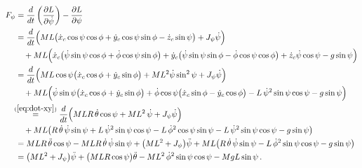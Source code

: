 \documentclass[a4paper]{article}
\newcommand{\pitch}{\psi}
\newcommand{\yaw}{\phi}
\newcommand{\roll}{\theta}
\begin{document}
\begin{equation} \begin{split}
    F_\pitch
    &= \frac{d}{dt} \left( \frac{\partial L}{\partial \dot\pitch} \right)
     - \frac{\partial L}{\partial \pitch}
    \\
    &= \frac{d}{dt} \Big( M L \big( \dot{x}_c \cos\pitch \cos\yaw
                                  + \dot{y}_c \cos\pitch \sin\yaw
                                  - \dot{z}_c \sin\pitch
                              \big)
                        + J_\pitch \dot\pitch
                    \Big)
    \\ &\quad + M L \Big( \dot{x}_c \big( \dot\pitch \sin\pitch \cos\yaw
                                        + \dot\yaw \cos\pitch \sin\yaw
                                    \big)
                        + \dot{y}_c \big( \dot\pitch \sin\pitch \sin\yaw
                                        - \dot\yaw \cos\pitch \cos\yaw
                                    \big)
                        + \dot{z}_c \dot\pitch \cos\pitch
                        - g \sin\pitch
                    \Big)
    \\
    &= \frac{d}{dt} \Big( M L \cos\pitch \big( \dot{x}_c \cos\yaw
                                             + \dot{y}_c \sin\yaw
                                         \big)
                        + M L^2 \dot\pitch \sin^2\pitch
                        + J_\pitch \dot\pitch
                    \Big)
    \\ &\quad + M L \Big( \dot\pitch \sin\pitch \big( \dot{x}_c \cos\yaw
                                                    + \dot{y}_c \sin\yaw
                                                \big)
                        + \dot\yaw \cos\pitch \big( \dot{x}_c \sin\yaw
                                                  - \dot{y}_c \cos\yaw
                                              \big)
                        - L \, \dot\pitch^2 \sin\pitch \cos\pitch
                        - g \sin\pitch
                    \Big)
    \\
    &\hspace{-1.5mm} \stackrel{(\ref{eq:dot-xy})}{=}
        \frac{d}{dt} \Big( M L R \, \dot\roll \cos\pitch
                         + M L^2 \, \dot\pitch
                         + J_\pitch \dot\pitch
                     \Big)
    \\ &\quad + M L \big( R \, \dot\roll \, \dot\pitch \sin\pitch
                        + L \, \dot\pitch^2 \sin\pitch \cos\pitch
                        - L \, \dot\yaw^2 \cos\pitch \sin\pitch
                        - L \, \dot\pitch^2 \sin\pitch \cos\pitch
                        - g \sin\pitch
                    \big)
    \\
    &= M L R \, \ddot\roll \cos\pitch
     - M L R \, \dot\roll \, \dot\pitch \sin\pitch
     + \big( M L^2 + J_\pitch \big) \ddot\pitch
     + M L \big( R \, \dot\roll \, \dot\pitch \sin\pitch
               - L \, \dot\yaw^2 \sin\pitch \cos\pitch
               - g \sin\pitch
           \big)
    \\
    &= \big( M L^2 + J_\pitch \big) \ddot\pitch
     + \big( M L R \cos\pitch \big) \ddot\roll
     - M L^2 \, \dot\yaw^2 \sin\pitch \cos\pitch
     - M g L \sin\pitch
    \,.
\end{split} \end{equation}
\end{document}
